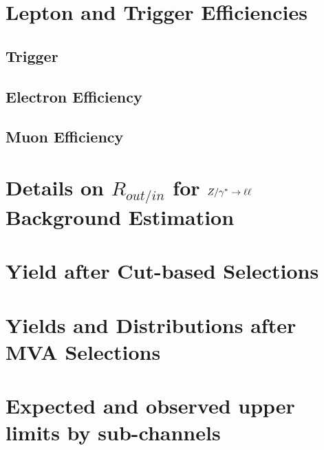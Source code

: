 \documentclass{cmspaper}
\begin{document}
\clearpage 
  \section{Lepton and Trigger Efficiencies}
     \label{app:efficiency_studies}
     \subsection{Trigger}
     \subsection{Electron Efficiency}
     \subsection{Muon Efficiency}

\clearpage 

\section{ Details on $R_{out/in}$ for $Z/\gamma^*\to\ell\ell$ Background Estimation}
     \label{app:appendix_dyr}
\clearpage




\clearpage 

  \section{Yield after Cut-based Selections}
     \label{app:appendix_cutresults}
\clearpage

  \section{Yields and Distributions after MVA Selections}
     \label{app:appendix_bdtresults}

\clearpage

  \section{Expected and observed upper limits by sub-channels}
     \label{app:subchannels}
\end{document}
